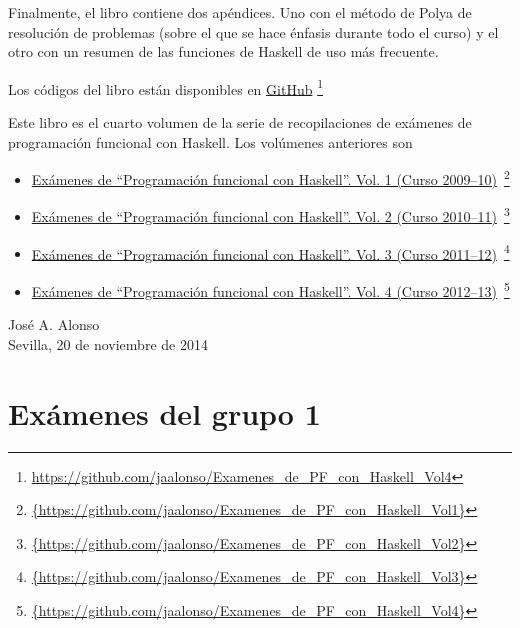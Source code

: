 \documentclass[a4paper,12pt,twoside]{book}
\begin{document}
Finalmente, el libro contiene dos apéndices. Uno con el método de Polya
de resolución de problemas (sobre el que se hace énfasis durante todo el
curso) y el otro con un resumen de las funciones de Haskell de uso más
frecuente.

Los códigos del libro están disponibles en
\href{https://github.com/jaalonso/Examenes_de_PF_con_Haskell_Vol5}
     {GitHub}
     \footnote{{\url{https://github.com/jaalonso/Examenes_de_PF_con_Haskell_Vol4}}}

Este libro es el cuarto volumen de la serie de recopilaciones de
exámenes de programación funcional con Haskell. Los volúmenes anteriores son
\begin{itemize}
\item
  \href{https://github.com/jaalonso/Examenes_de_PF_con_Haskell_Vol1}
  {Exámenes de ``Programaci\'on funcional con Haskell''.
    Vol. 1 (Curso 2009--10)}\
    \footnote{\url{{https://github.com/jaalonso/Examenes_de_PF_con_Haskell_Vol1}}}

\item
  \href{https://github.com/jaalonso/Examenes_de_PF_con_Haskell_Vol2}
  {Exámenes de ``Programaci\'on funcional con Haskell''.
    Vol. 2 (Curso 2010--11)}\
    \footnote{\url{{https://github.com/jaalonso/Examenes_de_PF_con_Haskell_Vol2}}}

\item
  \href{https://github.com/jaalonso/Examenes_de_PF_con_Haskell_Vol3}
  {Exámenes de ``Programaci\'on funcional con Haskell''.
    Vol. 3 (Curso 2011--12)}\
    \footnote{\url{{https://github.com/jaalonso/Examenes_de_PF_con_Haskell_Vol3}}}

\item
  \href{https://github.com/jaalonso/Examenes_de_PF_con_Haskell_Vol4}
  {Exámenes de ``Programaci\'on funcional con Haskell''.
    Vol. 4 (Curso 2012--13)}\
    \footnote{\url{{https://github.com/jaalonso/Examenes_de_PF_con_Haskell_Vol4}}}

\end{itemize}
     
\begin{flushright}
  José A. Alonso \\
  Sevilla, 20 de noviembre de 2014
\end{flushright}

\chapter{Exámenes del grupo 1}
\end{document}
